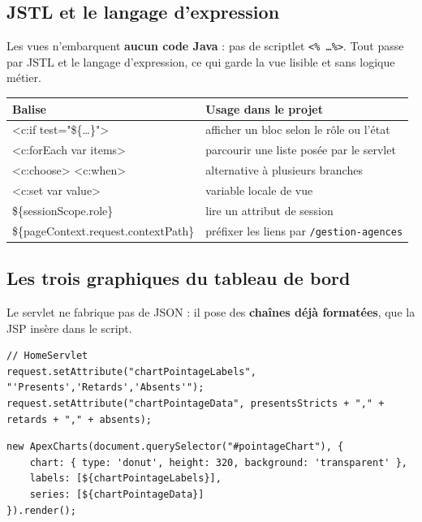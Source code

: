 \subsection{JSTL et le langage d'expression}

Les vues n'embarquent \textbf{aucun code Java} : pas de scriptlet
\texttt{<\% \dots \%>}. Tout passe par JSTL et le langage d'expression, ce qui
garde la vue lisible et sans logique métier.

\noindent\begin{tabularx}{\textwidth}{|>{\ttfamily}L{4.6cm}|X|}
\hline
\textmd{\textbf{Balise}} & \textbf{Usage dans le projet}\\
\hline
<c:if test="\$\{\dots\}"> & afficher un bloc selon le rôle ou l'état\\
\hline
<c:forEach var items> & parcourir une liste posée par le servlet\\
\hline
<c:choose> <c:when> & alternative à plusieurs branches\\
\hline
<c:set var value> & variable locale de vue\\
\hline
\$\{sessionScope.role\} & lire un attribut de session\\
\hline
\$\{pageContext.request.\newline contextPath\} & préfixer les liens par \texttt{/gestion-agences}\\
\hline
\end{tabularx}

\subsection{Les trois graphiques du tableau de bord}

Le servlet ne fabrique pas de JSON : il pose des \textbf{chaînes déjà
formatées}, que la JSP insère dans le script.

\begin{lstlisting}[style=java]
// HomeServlet
request.setAttribute("chartPointageLabels", "'Presents','Retards','Absents'");
request.setAttribute("chartPointageData", presentsStricts + "," + retards + "," + absents);
\end{lstlisting}

\begin{lstlisting}[style=jsp]
new ApexCharts(document.querySelector("#pointageChart"), {
    chart: { type: 'donut', height: 320, background: 'transparent' },
    labels: [${chartPointageLabels}],
    series: [${chartPointageData}]
}).render();
\end{lstlisting}

